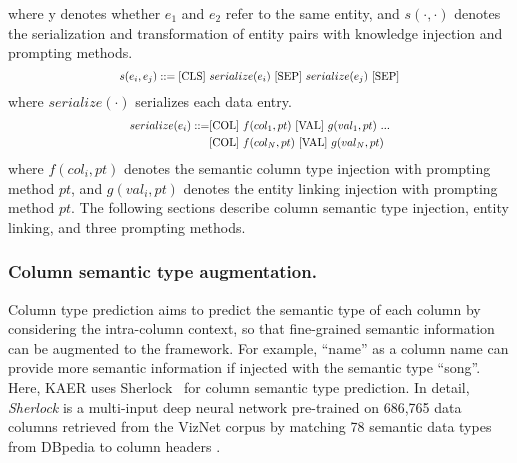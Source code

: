 where y denotes whether $e_1$ and $e_2$ refer to the same entity, and $s(\cdot,\cdot)$ denotes the serialization and transformation of entity pairs with knowledge injection and prompting methods. 
\begin{equation}
\Scale[0.8]{
    s(e_i, e_j) ::=  \text{[CLS]}\ serialize(e_i)\ \text{[SEP]}\ serialize(e_j)\ \text{[SEP]}} 
\end{equation}
where $serialize(\cdot)$ serializes each data entry.
\begin{equation}\Scale[0.8]{
\begin{split}
serialize(e_i) ::= & \text{[COL]}\ f(col_1,pt)\ \text{[VAL]}\ g(val_1,pt)\ ...\\
            & \text{[COL]}\ f(col_N,pt)\ \text{[VAL]}\ g(val_N,pt)   
\end{split}}
\end{equation}
where $f(col_i, pt)$ denotes the semantic column type injection with prompting method $pt$, and $g(val_i, pt)$ denotes the entity linking injection with prompting method $pt$. The following sections describe  column semantic type injection, entity linking, and three prompting methods.


\subsubsection{Column semantic type augmentation.}
Column type prediction aims to predict the semantic type of each column by considering the intra-column context, so that fine-grained semantic information can be augmented to the framework. For example, ``name'' as a column name can provide more semantic information if injected with the semantic type ``song''.  %
Here, KAER uses Sherlock~\cite{hulsebos_sherlock_2019} for column semantic type prediction. In detail, \textit{Sherlock} is a multi-input deep neural network pre-trained on 686,765 data columns retrieved from the 
VizNet corpus by matching 78 semantic data types from DBpedia to column headers \cite{hulsebos_sherlock_2019}. %

